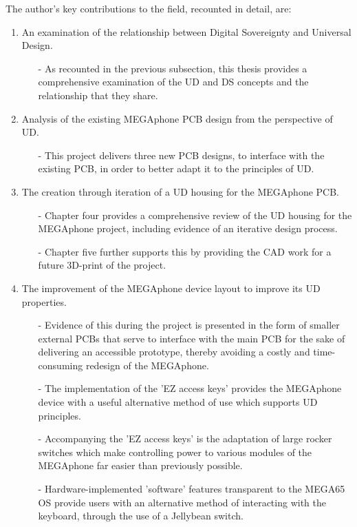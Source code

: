 The author's key contributions to the field, recounted in detail, are:
\begin{enumerate}
    \item An examination of the relationship between Digital Sovereignty and Universal Design.
        \begin{enumerate}
        \item[-] As recounted in the previous subsection, this thesis provides a comprehensive examination of the UD and DS concepts and the relationship that they share.
        \end{enumerate} 
    \item Analysis of the existing MEGAphone PCB design from the perspective of UD.
        \begin{enumerate}
        \item[-] This project delivers three new PCB designs, to interface with the existing PCB, in order to better adapt it to the principles of UD.
        \end{enumerate} 
    \item The creation through iteration of a UD housing for the MEGAphone PCB.
        \begin{enumerate}
        \item[-] Chapter four provides a comprehensive review of the UD housing for the MEGAphone project, including evidence of an iterative design process.
        \item[-] Chapter five further supports this by providing the CAD work for a future 3D-print of the project.
        \end{enumerate} 
    \item The improvement of the MEGAphone device layout to improve its UD properties.
        \begin{enumerate}
        \item[-] Evidence of this during the project is presented in the form of smaller external PCBs that serve to interface with the main PCB for the sake of delivering an accessible prototype, thereby avoiding a costly and time-consuming redesign of the MEGAphone.
        \item[-] The implementation of the 'EZ access keys' provides the MEGAphone device with a useful alternative method of use which supports UD principles.
        \item[-] Accompanying the 'EZ access keys' is the adaptation of large rocker switches which make controlling power to various modules of the MEGAphone far easier than previously possible.
        \item[-] Hardware-implemented 'software' features transparent to the MEGA65 OS provide users with an alternative method of interacting with the keyboard, through the use of a Jellybean switch.

\end{enumerate}
\end{enumerate}

